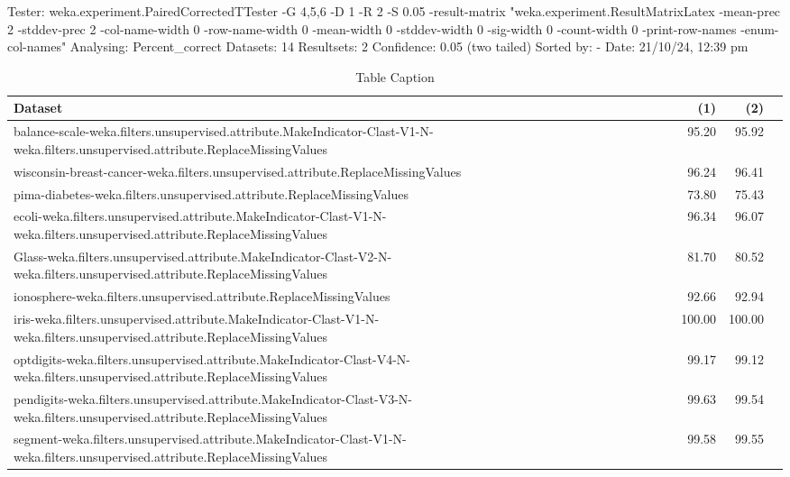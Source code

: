 Tester:     weka.experiment.PairedCorrectedTTester -G 4,5,6 -D 1 -R 2 -S 0.05 -result-matrix "weka.experiment.ResultMatrixLatex -mean-prec 2 -stddev-prec 2 -col-name-width 0 -row-name-width 0 -mean-width 0 -stddev-width 0 -sig-width 0 -count-width 0 -print-row-names -enum-col-names"
Analysing:  Percent_correct
Datasets:   14
Resultsets: 2
Confidence: 0.05 (two tailed)
Sorted by:  -
Date:       21/10/24, 12:39 pm


\begin{table}[thb]
\caption{\label{labelname}Table Caption}
\footnotesize
{\centering \begin{tabular}{lrr@{\hspace{0.1cm}}c}
\\
\hline
Dataset & (1)& (2) & \\
\hline
balance-scale-weka.filters.unsupervised.attribute.MakeIndicator-Clast-V1-N-weka.filters.unsupervised.attribute.ReplaceMissingValues &  95.20 &  95.92 &         \\
wisconsin-breast-cancer-weka.filters.unsupervised.attribute.ReplaceMissingValues &  96.24 &  96.41 &         \\
pima-diabetes-weka.filters.unsupervised.attribute.ReplaceMissingValues &  73.80 &  75.43 &         \\
ecoli-weka.filters.unsupervised.attribute.MakeIndicator-Clast-V1-N-weka.filters.unsupervised.attribute.ReplaceMissingValues &  96.34 &  96.07 &         \\
Glass-weka.filters.unsupervised.attribute.MakeIndicator-Clast-V2-N-weka.filters.unsupervised.attribute.ReplaceMissingValues &  81.70 &  80.52 &         \\
ionosphere-weka.filters.unsupervised.attribute.ReplaceMissingValues &  92.66 &  92.94 &         \\
iris-weka.filters.unsupervised.attribute.MakeIndicator-Clast-V1-N-weka.filters.unsupervised.attribute.ReplaceMissingValues & 100.00 & 100.00 &         \\
optdigits-weka.filters.unsupervised.attribute.MakeIndicator-Clast-V4-N-weka.filters.unsupervised.attribute.ReplaceMissingValues &  99.17 &  99.12 &         \\
pendigits-weka.filters.unsupervised.attribute.MakeIndicator-Clast-V3-N-weka.filters.unsupervised.attribute.ReplaceMissingValues &  99.63 &  99.54 &         \\
segment-weka.filters.unsupervised.attribute.MakeIndicator-Clast-V1-N-weka.filters.unsupervised.attribute.ReplaceMissingValues &  99.58 &  99.55 &         \\

\end{tabular}}
\end{table}
